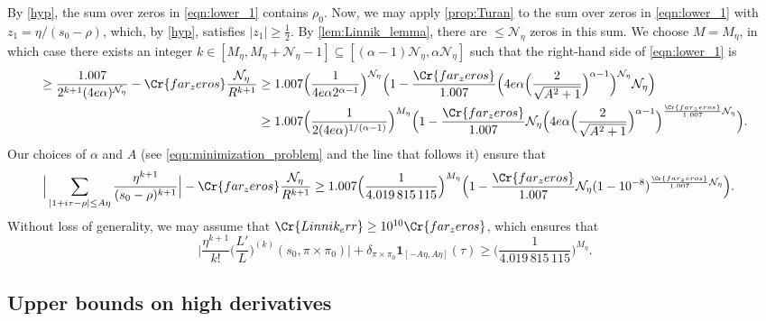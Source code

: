 \documentclass[11pt]{amsart}
\theoremstyle{remark}
\numberwithin{equation}{section}
\begin{document}
By \cref{hyp}, the sum over zeros in \eqref{eqn:lower_1} contains $\rho_0$.  Now, we may apply \cref{prop:Turan} to the sum over zeros in \eqref{eqn:lower_1} with $z_1 = \eta/(s_0-\rho)$, which, by \cref{hyp}, satisfies $|z_1|\geq\frac{1}{2}$.  By \cref{lem:Linnik_lemma}, there are $\leq \mathcal{N}_{\eta}$ zeros in this sum.  We choose $M=M_{\eta}$, in which case there exists an integer $k\in[M_{\eta}, M_{\eta}+\mathcal{N}_{\eta}-1]\subseteq [(\alpha-1)\mathcal{N}_{\eta},\alpha\mathcal{N}_{\eta}]$ such that the right-hand side of \eqref{eqn:lower_1} is
\begin{align*}
\geq \frac{1.007}{2^{k+1}(4e\alpha)^{\mathcal{N}_{\eta}}}-\Cr{far_zeros}\frac{\mathcal{N}_{\eta}}{R^{k+1}}&\geq 1.007\Big(\frac{1}{4e\alpha 2^{\alpha-1}}\Big)^{\mathcal{N}_{\eta}}\Big(1-\frac{\Cr{far_zeros}}{1.007}\Big(4e\alpha\Big(\frac{2}{\sqrt{A^2+1}}\Big)^{\alpha-1}\Big)^{\mathcal{N}_{\eta}}\mathcal{N}_{\eta}\Big)\\
&\geq 1.007\Big(\frac{1}{2(4e\alpha)^{1/(\alpha-1)}}\Big)^{M_{\eta}}\Big(1-\frac{\Cr{far_zeros}}{1.007}\mathcal{N}_{\eta}\Big(4e\alpha\Big(\frac{2}{\sqrt{A^2+1}}\Big)^{\alpha-1}\Big)^{\frac{\Cr{far_zeros}}{1.007}\mathcal{N}_{\eta}}\Big).
\end{align*}
Our choices of $\alpha$ and $A$ (see \eqref{eqn:minimization_problem} and the line that follows it) ensure that
\begin{align*}
\Big|\sum_{|1+i\tau-\rho|\leq A\eta}\frac{\eta^{k+1}}{(s_0-\rho)^{k+1}}\Big|-\Cr{far_zeros}\frac{\mathcal{N}_{\eta}}{R^{k+1}}
&\geq 1.007\Big(\frac{1}{4.019\,815\,115}\Big)^{M_{\eta}}\Big(1-\frac{\Cr{far_zeros}}{1.007}\mathcal{N}_{\eta}(1-10^{-8})^{\frac{\Cr{far_zeros}}{1.007}\mathcal{N}_{\eta}}\Big).
\end{align*}
Without loss of generality, we may assume that $\Cr{Linnik_err}\geq 10^{10}\Cr{far_zeros}$, which ensures that
\begin{equation}
\label{eqn:lower_bound_high_deriv}
\Bigg|\frac{\eta^{k+1}}{k!}\Big(\frac{L'}{L}\Big)^{(k)}(s_0,\pi\times\pi_0)\Bigg|+\delta_{\pi\times\pi_0}\mathbf{1}_{[-A\eta,A\eta]}(\tau)\geq \Big(\frac{1}{4.019\,815\,115}\Big)^{M_{\eta}}.
\end{equation}

\subsection{Upper bounds on high derivatives}
\end{document}
